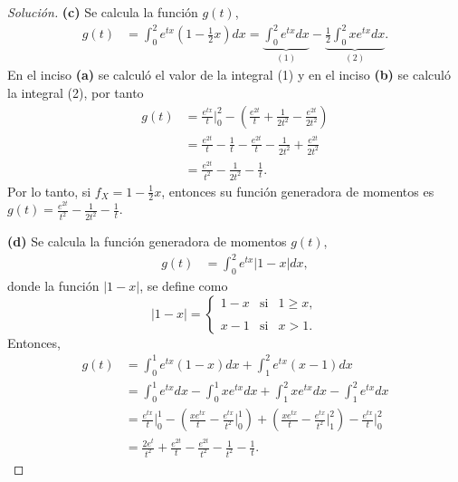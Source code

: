 \documentclass[12pt,letterpaper]{article}
\begin{document}
\begin{proof}[Solución]
\textbf{(c)} Se calcula la función $g(t)$,
\begin{align}
g(t) &= \int^{2}_{0} e^{tx} \left(1-\frac{1}{2}x\right)dx = \underbrace{\int^{2}_{0} e^{tx}dx}_{(1)} - \underbrace{\frac{1}{2} \int^{2}_{0} xe^{tx}dx}_{(2)}.
\end{align}
En el inciso \textbf{(a)} se calculó el valor de la integral (1) y en el inciso \textbf{(b)} se calculó la integral (2), por tanto
\begin{align}
g(t) &= \frac{e^{tx}}{t} \Big\lvert^{2}_{0} - \left(\frac{e^{2t}}{t} + \frac{1}{2t^2} - \frac{e^{2t}}{2t^2}\right) \\
& = \frac{e^{2t}}{t} - \frac{1}{t} - \frac{e^{2t}}{t} - \frac{1}{2t^2} + \frac{e^{2t}}{2t^2} \\
&= \frac{e^{2t}}{t^{2}} - \frac{1}{2t^2} - \frac{1}{t}.
\end{align}
Por lo tanto, si $f_{X}=1-\frac{1}{2}x$, entonces su función generadora de momentos es $g(t) = \frac{e^{2t}}{t^{2}} - \frac{1}{2t^2} - \frac{1}{t}.$

\textbf{(d)} Se calcula la función generadora de momentos $g(t)$,
\begin{align}
g(t) &= \int^{2}_{0} e^{tx} |1-x| dx,
\end{align}
donde la función $|1-x|$, se define como 
\begin{equation}
|1-x|= \left\{ \begin{array}{lcc}
             1-x &   \text{si}  & 1 \geqslant x, \\
             \\ x-1 &  \text{si} & x > 1. 
             \end{array}
   \right.
\end{equation}
Entonces,
\begin{align}
g(t) &= \int^{1}_{0} e^{tx}(1-x)dx + \int^{2}_{1} e^{tx}(x-1)dx \\
&= \int^{1}_0 e^{tx}dx - \int^{1}_{0} xe^{tx}dx + \int^{2}_{1}xe^{tx}dx - \int^{2}_{1}e^{tx}dx \\
&= \frac{e^{tx}}{t} \Big\lvert^{1}_{0} - \left(\frac{xe^{tx}}{t} - \frac{e^{tx}}{t^2} \Big\lvert^{1}_{0} \right) + \left(\frac{xe^{tx}}{t} - \frac{e^{tx}}{t^2} \Big\lvert^{2}_{1} \right) - \frac{e^{tx}}{t} \Big\lvert^2_0 \\
&= \frac{2e^{t}}{t^2} + \frac{e^{2t}}{t} - \frac{e^{2t}}{t^2} - \frac{1}{t^2} - \frac{1}{t}.
\end{align}


\end{proof}
\end{document}
